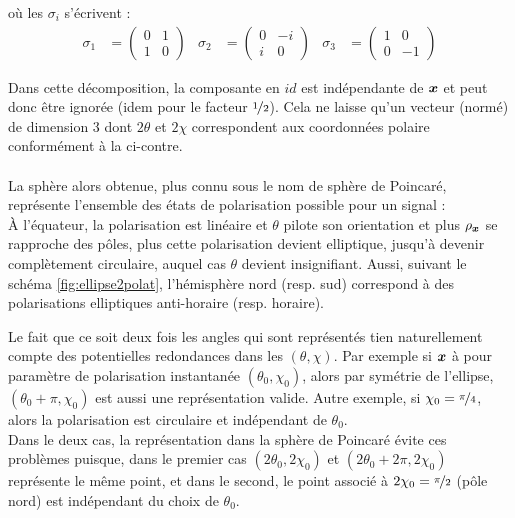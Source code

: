 \par \noindent
où les $\sigma_i$ s'écrivent :
\begin{align*}
	\sigma_1 &= \begin{pmatrix} 0 & 1 \\ 1 &  0 \end{pmatrix}  &
	\sigma_2 &= \begin{pmatrix} 0 & -i \\  i &  0 \end{pmatrix}  &
	\sigma_3 &= \begin{pmatrix} 1 & 0 \\ 0 & -1 \end{pmatrix}
\end{align*}
\skipl

Dans cette décomposition, la composante en $id$ est indépendante de $\boldsymbol{x}$ et peut donc être ignorée (idem pour le facteur $\nicefrac{1}{2}$). Cela ne laisse qu'un vecteur (normé) de dimension 3 dont $2\theta$ et $2\chi$ correspondent aux coordonnées polaire conformément à la  ci-contre.
\\ 
\\
La sphère alors obtenue, plus connu sous le nom de sphère de Poincaré, représente l'ensemble des états de polarisation possible pour un signal :
\\
À l'équateur, la polarisation est linéaire et $\theta$ pilote son orientation et plus $\rho_{\boldsymbol{x}}$ se rapproche des pôles, plus cette polarisation devient elliptique, jusqu'à devenir complètement circulaire, auquel cas $\theta$ devient insignifiant. 
Aussi, suivant le schéma \cref{fig:ellipse2polat}, l'hémisphère nord (resp. sud) correspond à des polarisations elliptiques anti-horaire (resp. horaire).

Le fait que ce soit deux fois les angles qui sont représentés tien naturellement compte des potentielles redondances dans les $(\theta,\chi)$. 
Par exemple si $\boldsymbol{x}$ à pour paramètre de polarisation instantanée $(\theta_0, \chi_0)$, alors par symétrie de l'ellipse, $(\theta_0+\pi, \chi_0)$ est aussi une représentation valide. Autre exemple, si $\chi_0 = \nicefrac{\pi}{4}$, alors la polarisation est circulaire et indépendant de $\theta_0$.
\\
Dans le deux cas, la représentation dans la sphère de Poincaré évite ces problèmes puisque, dans le premier cas $(2\theta_0, 2\chi_0)$ et $(2\theta_0+2\pi, 2\chi_0)$ représente le même point, et dans le second, le point associé à $2\chi_0=\nicefrac{\pi}{2}$ (pôle nord) est indépendant du choix de $\theta_0$.
\\

